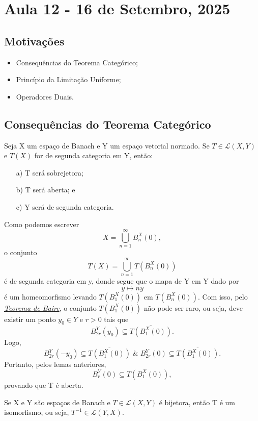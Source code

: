 \documentclass[../functional_analysis.tex]{subfiles}
\begin{document}
\section{Aula 12 - 16 de Setembro, 2025}
\subsection{Motivações}
\begin{itemize}
	\item Consequências do Teorema Categórico;
	\item Princípio da Limitação Uniforme;
	\item Operadores Duais.
\end{itemize}
\subsection{Consequências do Teorema Categórico}
\begin{theorem*}
	Seja X um espaço de Banach e Y um espaço vetorial normado. Se \(T\in \mathcal{L}(X, Y)\) e \(T(X)\) for de segunda categoria em Y, então:
	\begin{itemize}
		\item[a)] T será sobrejetora;
		\item[b)] T será aberta; e
		\item[c)] Y será de segunda categoria.
	\end{itemize}
\end{theorem*}
\begin{proof*}
	Como podemos escrever
	\[
		X = \bigcup_{n=1}^{\infty}B_{n}^{X}(0),
	\]
	o conjunto
	\[
		T(X) = \bigcup_{n=1}^{\infty}T(B_{n}^{X}(0))
	\]
	é de segunda categoria em y, donde segue que o mapa de Y em Y dado por
	\[
		y\mapsto ny
	\]
	é um homeomorfismo levando \(T(B_{1}^{X}(0))\) em \(T(B_{n}^{X}(0))\). Com isso, pelo \hyperlink{baire_theorem}{\textit{Teorema de Baire}}, o conjunto
	\(T(B_{1}^{X}(0))\) não pode ser raro, ou seja, deve existir um ponto \(y_{0}\in Y\) e \(r > 0\) tais que
	\[
		B_{2r}^{Y}(y_{0})\subseteq \overline{T(B_{1}^{X}(0))}.
	\]
	Logo,
	\[
		B_{2r}^{Y}(-y_{0})\subseteq \overline{T(B_{1}^{X}(0))}\;\&\; B_{2r}^{Y}(0)\subseteq \overline{T(B_{1}^{X}(0))}.
	\]
	Portanto, pelos lemas anteriores,
	\[
		B_{r}^{Y}(0)\subseteq T(B_{1}^{X}(0)),
	\]
	provando que T é aberta. \qedsymbol
\end{proof*}
\begin{crl*}
	Se X e Y são espaços de Banach e \(T\in \mathcal{L}(X, Y)\) é bijetora, então T é um isomorfismo, ou seja, \(T^{-1}\in \mathcal{L}(Y, X)\).
\end{crl*}
\end{document}

